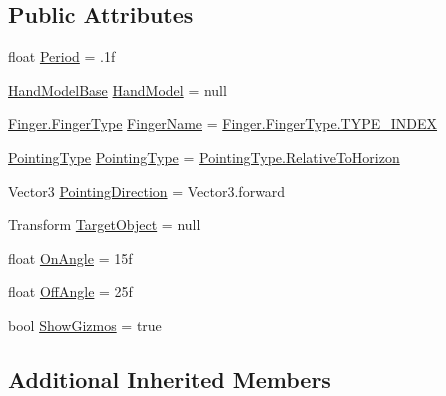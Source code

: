 \subsection*{Public Attributes}
\begin{DoxyCompactItemize}
\item 
float \mbox{\hyperlink{class_leap_1_1_unity_1_1_finger_direction_detector_ab70cf353126c82e1f4fb4a159ad60b50}{Period}} = .\+1f
\item 
\mbox{\hyperlink{class_leap_1_1_unity_1_1_hand_model_base}{Hand\+Model\+Base}} \mbox{\hyperlink{class_leap_1_1_unity_1_1_finger_direction_detector_a77aca25282ecbc1decc67ecf44a9561a}{Hand\+Model}} = null
\item 
\mbox{\hyperlink{class_leap_1_1_finger_ae75e8d46a01aff0bd5c6d6fb99e2f2ba}{Finger.\+Finger\+Type}} \mbox{\hyperlink{class_leap_1_1_unity_1_1_finger_direction_detector_a73b21690811ff68505ea419bf1270d1f}{Finger\+Name}} = \mbox{\hyperlink{class_leap_1_1_finger_ae75e8d46a01aff0bd5c6d6fb99e2f2baae935a2bcf041187b5d3530f6084c5914}{Finger.\+Finger\+Type.\+T\+Y\+P\+E\+\_\+\+I\+N\+D\+EX}}
\item 
\mbox{\hyperlink{namespace_leap_1_1_unity_a34b9e7741bfe47e7a9b1c2bffbe7f4cf}{Pointing\+Type}} \mbox{\hyperlink{class_leap_1_1_unity_1_1_finger_direction_detector_a2161d1a746e283cce4a95f619fb699c1}{Pointing\+Type}} = \mbox{\hyperlink{namespace_leap_1_1_unity_a34b9e7741bfe47e7a9b1c2bffbe7f4cfa31999ab3e9ca81aefc5d2bc9c075f580}{Pointing\+Type.\+Relative\+To\+Horizon}}
\item 
Vector3 \mbox{\hyperlink{class_leap_1_1_unity_1_1_finger_direction_detector_aeab7a19eb59f898c7d4be2bdf35cf5e5}{Pointing\+Direction}} = Vector3.\+forward
\item 
Transform \mbox{\hyperlink{class_leap_1_1_unity_1_1_finger_direction_detector_a2f90f8d78d0447b6129b6a43c7ecee09}{Target\+Object}} = null
\item 
float \mbox{\hyperlink{class_leap_1_1_unity_1_1_finger_direction_detector_a420e6bdcd701b20b3c6a95003c0b4c44}{On\+Angle}} = 15f
\item 
float \mbox{\hyperlink{class_leap_1_1_unity_1_1_finger_direction_detector_a234c17e715950ba6810e2f3ae86a5d15}{Off\+Angle}} = 25f
\item 
bool \mbox{\hyperlink{class_leap_1_1_unity_1_1_finger_direction_detector_a9bbe98671cb2301bb9f6b4eee2e115e7}{Show\+Gizmos}} = true
\end{DoxyCompactItemize}
\subsection*{Additional Inherited Members}


